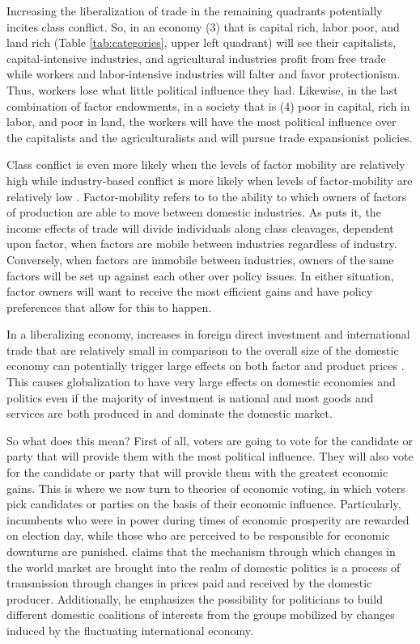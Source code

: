 \documentclass[12pt,letterpaper]{article}
\begin{document}
Increasing the liberalization of trade in the remaining quadrants potentially incites class conflict. So, in an economy (3) that is capital rich, labor poor, and land rich (Table \ref{tab:categories}, upper left quadrant) will see their capitalists, capital-intensive industries, and agricultural industries profit from free trade while workers and labor-intensive industries will falter and favor protectionism. Thus, workers lose what little political influence they had. Likewise, in the last combination of factor endowments, in a society that is (4) poor in capital, rich in labor, and poor in land, the workers will have the most political influence over the capitalists and the agriculturalists and will pursue trade expansionist policies. 

Class conflict is even more likely when the levels of factor mobility are relatively high while industry-based conflict is more likely when levels of factor-mobility are relatively low \citep{Hiscox2001}. Factor-mobility refers to to the ability to which owners of factors of production are able to move between domestic industries. As \citet{Hiscox2001} puts it, the income effects of trade will divide individuals along class cleavages, dependent upon factor, when factors are mobile between industries regardless of industry. Conversely, when factors are immobile between industries, owners of the same factors will be set up against each other over policy issues. In either situation, factor owners will want to receive the most efficient gains and have policy preferences that allow for this to happen. 

In a liberalizing economy, increases in foreign direct investment and international trade that are relatively small in comparison to the overall size of the domestic economy can potentially trigger large effects on both factor and product prices \citep{Wood1994, Rodrik1997, Feenstra1998}. This causes globalization to have very large effects on domestic economies and politics even if the majority of investment is national and most goods and services are both produced in and dominate the domestic market.

So what does this mean? First of all, voters are going to vote for the candidate or party that will provide them with the most political influence. They will also vote for the candidate or party that will provide them with the greatest economic gains. This is where we now turn to theories of economic voting, in which voters pick candidates or parties on the basis of their economic influence. Particularly, incumbents who were in power during times of economic prosperity are rewarded on election day, while those who are perceived to be responsible for economic downturns are punished. \citet{Gourevitch1986} claims that the mechanism through which changes in the world market are brought into the realm of domestic politics is a process of transmission through changes in prices paid and received by the domestic producer. Additionally, he emphasizes the possibility for politicians to build different domestic coalitions of interests from the groups mobilized by changes induced by the fluctuating international economy. 
\end{document}
